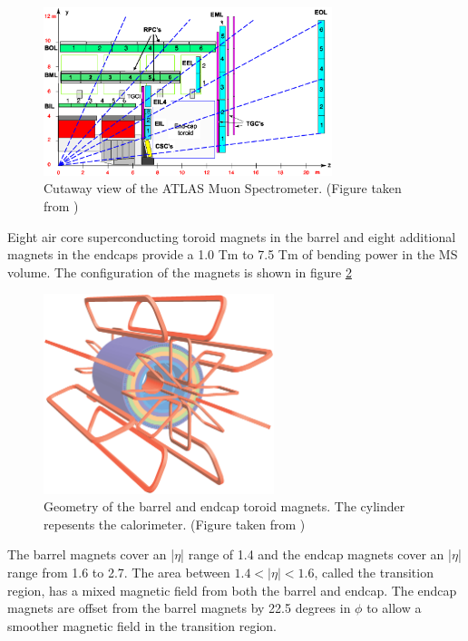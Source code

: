 \begin{figure}[h!]
\centering
\includegraphics[width=0.75\textwidth, angle=0]{figures/LHC_ATLAS/Muon_rz_large_sect_6.eps}
\caption{ Cutaway view of the ATLAS Muon Spectrometer.  (Figure taken from \cite{ATLAS_JINST}) \label{LHC:fig:ATLASMuonSpec}}
\end{figure}

\indent Eight air core superconducting toroid magnets in the barrel and eight additional magnets in the endcaps provide a 1.0 Tm to 7.5 Tm of bending power in the MS volume. The configuration of the magnets is shown in figure \ref{LHC:fig:ATLASMag} ~\\

\begin{figure}[h!]
\centering
\includegraphics[width=0.60\textwidth, angle=270]{figures/LHC_ATLAS/ATLcoilGeom.eps}
\caption{ Geometry of the barrel and endcap toroid magnets. The cylinder repesents the calorimeter. (Figure taken from \cite{ATLAS_JINST}) \label{LHC:fig:ATLASMag}}
\end{figure}

\indent The barrel magnets cover an |$\eta$| range of 1.4 and the endcap magnets cover an |$\eta$| range from 1.6 to 2.7. The area between $1.4 < |\eta| < 1.6$, called the transition region, has a mixed magnetic field from both the barrel and endcap. The endcap magnets are offset from the barrel magnets by 22.5 degrees in $\phi$ to allow a smoother magnetic field in the transition region. \\

